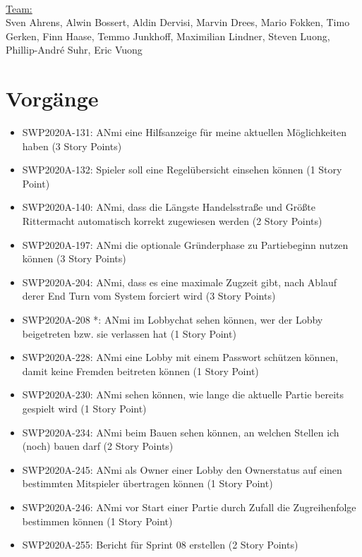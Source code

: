 \documentclass[12pt,a4paper, oneside]{article}
\begin{document}

    \noindent
    \\
    \underline {Team:}
    \\
    Sven Ahrens, Alwin Bossert, Aldin Dervisi, Marvin Drees, Mario Fokken,
    Timo Gerken, Finn Haase, Temmo Junkhoff, Maximilian Lindner, Steven Luong, Phillip-André Suhr, Eric Vuong


    \section{Vorgänge}
    \begin{itemize}
        \item SWP2020A-131: ANmi eine Hilfsanzeige für meine aktuellen Möglichkeiten haben (3 Story Points)
        \item SWP2020A-132: Spieler soll eine Regelübersicht einsehen können (1 Story Point)
        \item SWP2020A-140: ANmi, dass die Längste Handelsstraße und Größte Rittermacht automatisch korrekt zugewiesen werden (2  Story Points)
        \item SWP2020A-197: ANmi die optionale Gründerphase zu Partiebeginn nutzen können (3 Story Points)
        \item SWP2020A-204: ANmi, dass es eine maximale Zugzeit gibt, nach Ablauf derer End Turn vom System forciert wird (3 Story Points)
        \item SWP2020A-208 *: ANmi im Lobbychat sehen können, wer der Lobby beigetreten bzw. sie verlassen hat (1 Story Point)
        \item SWP2020A-228: ANmi eine Lobby mit einem Passwort schützen können, damit keine Fremden beitreten können (1 Story Point)
        \item SWP2020A-230: ANmi sehen können, wie lange die aktuelle Partie bereits gespielt wird (1 Story Point)
        \item SWP2020A-234: ANmi beim Bauen sehen können, an welchen Stellen ich (noch) bauen darf (2 Story Points)
        \item SWP2020A-245: ANmi als Owner einer Lobby den Ownerstatus auf einen bestimmten Mitspieler übertragen können (1  Story Point)
        \item SWP2020A-246:	ANmi vor Start einer Partie durch Zufall die Zugreihenfolge bestimmen können (1 Story Point)
        \item SWP2020A-255:	Bericht für Sprint 08 erstellen (2 Story Points)

\end{itemize}
\end{document}
